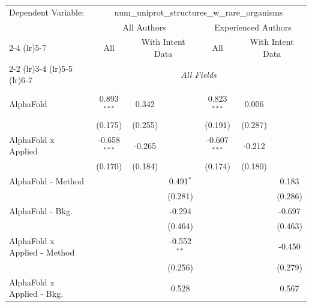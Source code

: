 \begingroup
\centering
\begin{tabular}{lcccccc}
   \tabularnewline \midrule \midrule
   Dependent Variable: & \multicolumn{6}{c}{num\_uniprot\_structures\_w\_rare\_organisms}\\
 & \multicolumn{3}{c}{All Authors} & \multicolumn{3}{c}{Experienced Authors} \\
\cmidrule(lr){2-4} \cmidrule(lr){5-7}
 & \multicolumn{1}{c}{All} & \multicolumn{2}{c}{With Intent Data} & \multicolumn{1}{c}{All} & \multicolumn{2}{c}{With Intent Data} \\
\cmidrule(lr){2-2} \cmidrule(lr){3-4} \cmidrule(lr){5-5} \cmidrule(lr){6-7}
 & \multicolumn{6}{c}{\textit{All Fields}} \\ \\
   AlphaFold                      & 0.893$^{***}$  & 0.342         &               & 0.823$^{***}$  & 0.006         &   \\   
                                  & (0.175)        & (0.255)       &               & (0.191)        & (0.287)       &   \\   
   AlphaFold x Applied            & -0.658$^{***}$ & -0.265        &               & -0.607$^{***}$ & -0.212        &   \\   
                                  & (0.170)        & (0.184)       &               & (0.174)        & (0.180)       &   \\   
   AlphaFold - Method             &                &               & 0.491$^{*}$   &                &               & 0.183\\   
                                  &                &               & (0.281)       &                &               & (0.286)\\   
   AlphaFold - Bkg.               &                &               & -0.294        &                &               & -0.697\\   
                                  &                &               & (0.464)       &                &               & (0.463)\\   
   AlphaFold x Applied - Method   &                &               & -0.552$^{**}$ &                &               & -0.450\\   
                                  &                &               & (0.256)       &                &               & (0.279)\\   
   AlphaFold x Applied - Bkg.     &                &               & 0.528         &                &               & 0.567\\   

\end{tabular}
